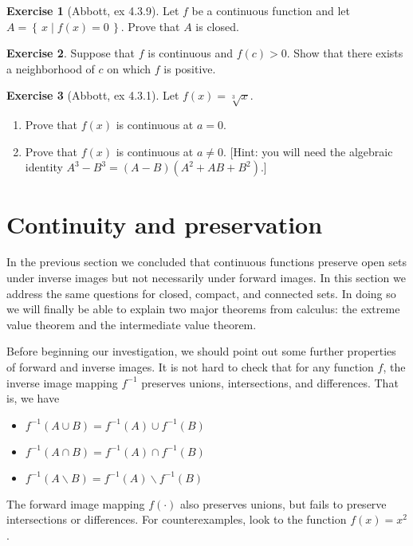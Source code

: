 \documentclass[11pt,oneside]{amsbook}
\newcommand{\set}[1]{\left\{\,#1\,\right\}}
\renewcommand{\setminus}{\smallsetminus}
\theoremstyle{definition}
\newtheorem{exerc}{Exercise}[section]
\theoremstyle{plain}
\theoremstyle{definition}
\theoremstyle{remark}
\numberwithin{equation}{section}
\numberwithin{figure}{section}
\begin{document}
\begin{exerc}[Abbott, ex 4.3.9]
  Let $f$ be a continuous function and let $A=\set{x\mid f(x)=0}$. Prove that $A$ is closed.
\end{exerc}

\begin{exerc}
  Suppose that $f$ is continuous and $f(c)>0$. Show that there exists a neighborhood of $c$ on which $f$ is positive.
\end{exerc}

\begin{exerc}[Abbott, ex 4.3.1]
  Let $f(x)=\sqrt[3]{x}$.
  \begin{enumerate}
    \item Prove that $f(x)$ is continuous at $a=0$.
    \item Prove that $f(x)$ is continuous at $a\neq0$. [Hint: you will need the algebraic identity $A^3-B^3=(A-B)(A^2+AB+B^2)$.]
  \end{enumerate}
\end{exerc}

\newpage
\section{Continuity and preservation}

In the previous section we concluded that continuous functions preserve open sets under inverse images but not necessarily under forward images. In this section we address the same questions for closed, compact, and connected sets. In doing so we will finally be able to explain two major theorems from calculus: the extreme value theorem and the intermediate value theorem.

Before beginning our investigation, we should point out some further properties of forward and inverse images. It is not hard to check that for any function $f$, the inverse image mapping $f^{-1}$ preserves unions, intersections, and differences. That is, we have
\begin{itemize}
\item $f^{-1}(A\cup B)=f^{-1}(A)\cup f^{-1}(B)$
\item $f^{-1}(A\cap B)=f^{-1}(A)\cap f^{-1}(B)$
\item $f^{-1}(A\setminus B)=f^{-1}(A)\setminus f^{-1}(B)$
\end{itemize}
The forward image mapping $f(\cdot)$ also preserves unions, but fails to preserve intersections or differences. For counterexamples, look to the function $f(x)=x^2$.
\end{document}
